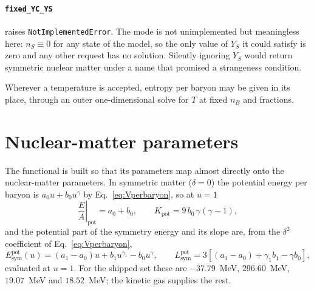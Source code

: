 \documentclass[aps,prc,onecolumn,superscriptaddress,nofootinbib,10pt]{revtex4-2}
\newcommand{\nB}{n_B}
\newcommand{\nS}{n_S}
\begin{document}
\paragraph{\texttt{fixed\_YC\_YS}} raises \texttt{NotImplementedError}. The
mode is not unimplemented but meaningless here: $\nS \equiv 0$ for any state
of the model, so the only value of $Y_S$ it could satisfy is zero and any
other request has no solution. Silently ignoring $Y_S$ would return symmetric
nuclear matter under a name that promised a strangeness condition.

\medskip
Wherever a temperature is accepted, entropy per baryon may be given in its
place, through an outer one-dimensional solve for $T$ at fixed $\nB$ and
fractions.

\section{Nuclear-matter parameters}
\label{sec:nmp}

The functional is built so that its parameters map almost directly onto the
nuclear-matter parameters. In symmetric matter ($\delta = 0$) the potential
energy per baryon is $a_0 u + b_0 u^{\gamma}$ by
Eq.~\eqref{eq:Vperbaryon}, so at $u = 1$
%
\begin{equation}
\left. \frac{E}{A} \right|_{\mathrm{pot}} = a_0 + b_0 , \qquad
K_{\mathrm{pot}} = 9\, b_0\, \gamma (\gamma - 1) ,
\end{equation}
%
and the potential part of the symmetry energy and its slope are, from the
$\delta^2$ coefficient of Eq.~\eqref{eq:Vperbaryon},
%
\begin{equation}
E_{\mathrm{sym}}^{\mathrm{pot}}(u) = (a_1 - a_0) u + b_1 u^{\gamma_1}
   - b_0 u^{\gamma} , \qquad
L_{\mathrm{sym}}^{\mathrm{pot}} = 3 \left[ (a_1 - a_0)
   + \gamma_1 b_1 - \gamma b_0 \right] ,
\end{equation}
%
evaluated at $u = 1$. For the shipped set these are $-37.79$~MeV,
$296.60$~MeV, $19.07$~MeV and $18.52$~MeV; the kinetic gas supplies the rest.
\end{document}
